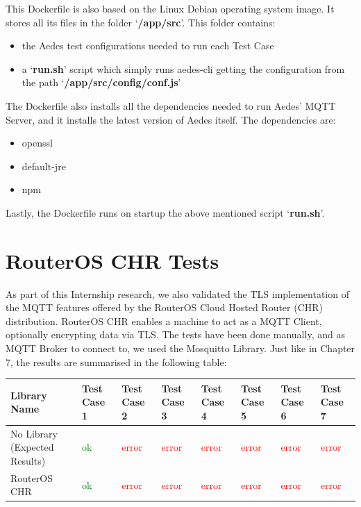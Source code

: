\documentclass[binding=0.6cm,noexaminfo]{sapthesis}
\begin{document}
This Dockerfile is also based on the Linux Debian operating system image. It stores all its files in the folder `\textbf{/app/src}'. This folder contains:
\begin{itemize}
	\item the Aedes test configurations needed to run each Test Case
	\item a `\textbf{run.sh}' script which simply runs aedes-cli getting the configuration from the path `\textbf{/app/src/config/conf.js}'
\end{itemize}
The Dockerfile also installs all the dependencies needed to run Aedes' MQTT Server, and it installs the latest version of Aedes itself.
The dependencies are:
\begin{itemize}
	\item openssl
	\item default-jre
	\item npm
\end{itemize}
Lastly, the Dockerfile runs on startup the above mentioned script `\textbf{run.sh}'.
\chapter{RouterOS CHR Tests}
As part of this Internship research, we also validated the TLS implementation of the MQTT features offered by the RouterOS Cloud Hosted Router (CHR) distribution. RouterOS CHR enables a machine to act as a MQTT Client, optionally encrypting data via TLS. The tests have been done manually, and as MQTT Broker to connect to, we used the Mosquitto Library. Just like in Chapter 7, the results are summarised in the following table:

\begin{flushleft}
\begin{tabular}{| p{2cm} | p{1.5cm} | p{1.5cm} | p{1.5cm} | p{1.5cm} | p{1.5cm} | p{1.5cm} | p{1.5cm} |}
\hline
\bf Library Name & \bf Test Case 1 & \bf Test Case 2 & \bf Test Case 3 & \bf Test Case 4 & \bf Test Case 5 & \bf Test Case 6 & \bf Test Case 7 \\
\hline
No Library (Expected Results) & \textcolor{green}{ok} & \textcolor{red}{error} & \textcolor{red}{error} & \textcolor{red}{error} & \textcolor{red}{error} & \textcolor{red}{error} & \textcolor{red}{error} \\
\hline
RouterOS CHR & \textcolor{green}{ok} & \textcolor{red}{error} & \textcolor{red}{error} & \textcolor{red}{error} & \textcolor{red}{error} & \textcolor{red}{error} & \textcolor{red}{error} \\
\hline
\end{tabular}
\end{flushleft}
\end{document}
